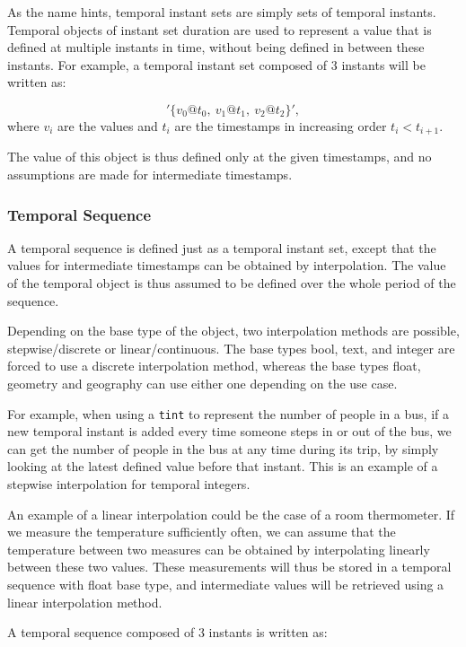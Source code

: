 As the name hints, temporal instant sets are simply sets of temporal instants. Temporal objects of instant set duration are used to represent a value that is defined at multiple instants in time, without being defined in between these instants. For example, a temporal instant set composed of 3 instants will be written as:

\[
    '\{v_0@t_0,\ v_1@t_1,\ v_2@t_2\}',
\]
where \(v_i\) are the values and \(t_i\) are the timestamps in increasing order \(t_i < t_{i+1}\).

The value of this object is thus defined only at the given timestamps, and no assumptions are made for intermediate timestamps.

\subsubsection{Temporal Sequence}
\label{section:mobilitydb_seq}

A temporal sequence is defined just as a temporal instant set, except that the values for intermediate timestamps can be obtained by interpolation. The value of the temporal object is thus assumed to be defined over the whole period of the sequence.

Depending on the base type of the object, two interpolation methods are possible, stepwise/discrete or linear/continuous. The base types bool, text, and integer are forced to use a discrete interpolation method, whereas the base types float, geometry and geography can use either one depending on the use case.

For example, when using a \lstinline{tint} to represent the number of people in a bus, if a new temporal instant is added every time someone steps in or out of the bus, we can get the number of people in the bus at any time during its trip, by simply looking at the latest defined value before that instant. This is an example of a stepwise interpolation for temporal integers.

An example of a linear interpolation could be the case of a room thermometer. If we measure the temperature sufficiently often, we can assume that the temperature between two measures can be obtained by interpolating linearly between these two values. These measurements will thus be stored in a temporal sequence with float base type, and intermediate values will be retrieved using a linear interpolation method.

A temporal sequence composed of 3 instants is written as:

